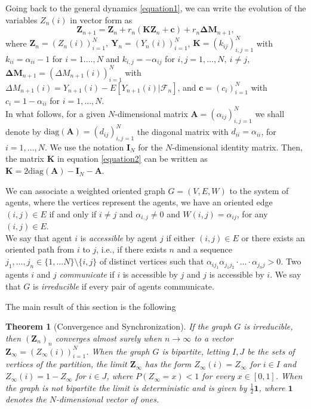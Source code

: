 \documentclass[article,12pt]{article}
\theoremstyle{plain}
\newtheorem{theorem}{Theorem}[section]
\theoremstyle{definition}
\theoremstyle{remark}
\numberwithin{equation}{section}
\numberwithin{theorem}{section}
\begin{document}
		
		Going back to the general dynamics \eqref{equation1}, 
		we can write the evolution of the variables $Z_n(i)$ in vector form as 
		\begin{equation}\label{equation2}
			\mathbf{Z}_{n+1}=\mathbf{Z}_n+ r_n (\mathbf{K}\mathbf{Z}_n+\mathbf{c})+ r_n \mathbf{\Delta M}_{n+1},
		\end{equation}
		where $\mathbf{Z}_n=(Z_n(i))_{i=1}^N,\ \mathbf{Y}_{n}=(Y_{n}(i))_{i=1}^N$, $\mathbf{K}=(k_{ij})_{i,j=1}^N$ with $k_{ii}=\alpha_{ii}-1$ for $i=1.\ldots, N$ and $k_{i, j}=-\alpha_{ij}$ for $i,j=1,\ldots, N,\ i\neq j$,\  
		$ \mathbf{\Delta M}_{n+1}=(\Delta M_{n+1}(i))_{i=1}^N$ with $\Delta M_{n+1}(i)= Y_{n+1}(i)-E[Y_{n+1}(i)|\mathcal{F}_n]$, and $\mathbf{c}=(c_i)_{i=1}^N$ with $c_i=1-\alpha_{ii}$ for $i=1,\ldots, N$. \\
		
		
		
		
		In what follows, for a given $N$-dimensional matrix $\mathbf{A}=(\alpha_{ij})_{i,j=1}^N$ we shall denote by $\mathrm{diag}(\mathbf{A})=(d_{ij})_{i,j=1}^N$ the diagonal matrix with $d_{ii}=\alpha_{ii}$, for $i=1,\ldots, N$. We use the notation $\mathbf{I}_N$ for the $N$-dimensional identity matrix. Then, the matrix $\mathbf{K}$ in equation \eqref{equation2} can be written as $\mathbf{K}=2\mathrm{diag}(\mathbf{A})-\mathbf{I}_N-\mathbf{A}$.  
		
		
		We can associate a weighted oriented graph $G=(V,E, W)$ to the system of agents, where the vertices represent the agents, we have an oriented edge $(i,j)\in E$ if and only if $i\neq j$ and $\alpha_{i, j}\neq 0$ and $W(i,j)=\alpha_{ij}$, for any $(i,j)\in E$. \\
		We say that agent $i$ is \emph{accessible} by agent $j$ if either $(i,j)\in E$ or there exists an oriented path from $i$ to $j$, i.e., if there exists $n$ and a sequence $j_1,\ldots, j_n\in \{1,\ldots N\}\setminus\{i, j\}$ of distinct vertices such that 
		$\alpha_{ij_1}\alpha_{j_1j_2}\cdot\ldots\cdot\alpha_{j_nj}>0$. Two agents $i$ and $j$ \emph{communicate} if $i$ is accessible by $j$ and $j$ is accessible by $i$. We say that $G$ is \emph{irreducible} if every pair of agents communicate. 
		
		The main result of this section is the following 
		
		\begin{theorem}[Convergence and Synchronization]\label{convergence}
			If the graph $G$ is irreducible, then $(\mathbf{Z}_n)_n$ converges almost surely when $n\to \infty$ to a vector $\mathbf{Z}_\infty=(Z_\infty(i))_{i=1}^N$. 
			When the graph $G$ is bipartite, 
			letting $I, J$ be the sets of vertices of the partition, the limit $\mathbf{Z}_\infty$ has the form $Z_\infty(i)=Z_\infty$ for $i\in I$ and $Z_{\infty}(i)=1-Z_\infty$ for $i\in J$, where $P(Z_\infty=x)<1$ for every $x\in [0,1]$. When the graph is not bipartite the limit is deterministic and is given by $\frac{1}{2}\mathbf{1}$, where $\mathbf{1}$ denotes the $N$-dimensional vector of ones.
		\end{theorem}
		
\end{document}
